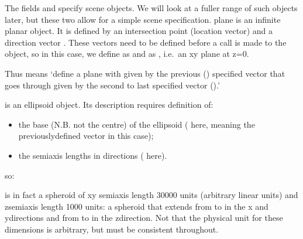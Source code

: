 \documentclass[letterpaper,10pt,english]{sphinxmanual}
\begin{document}
The fields  and  specify scene objects. We will look at a fuller range of such objects later, but these two allow for a simple scene specification. plane is an infinite planar object. It is defined by an intersection point (location vector)  and a direction vector . These vectors need to be defined before a call is made to the object, so in this case, we define  as  and  as , i.e. an x\sphinxhyphen{}y plane at z=0.

Thus  means ‘define a plane with  given by the previous () specified vector that goes through  given by the second to last specified vector ().’

 is an ellipsoid object. Its description requires definition of:
\begin{itemize}
\item {} 
the base (N.B. not the centre) of the ellipsoid ( here, meaning the previously\sphinxhyphen{}defined vector \sphinxhyphen{}  in this case);

\item {} 
the semi\sphinxhyphen{}axis lengths in  directions ( here).

\end{itemize}

so:

\begin{sphinxVerbatim}[commandchars=\\\{\}]
   
    
\end{sphinxVerbatim}

is in fact a spheroid of x\sphinxhyphen{}y semi\sphinxhyphen{}axis length 30000 units (arbitrary linear units) and z\sphinxhyphen{}semi\sphinxhyphen{}axis length 1000 units: a  spheroid that extends from  to  in the x\sphinxhyphen{} and y\sphinxhyphen{}directions and from  to  in the z\sphinxhyphen{}direction. Not that the physical unit for these dimensions is arbitrary, but must be consistent throughout.
\end{document}
